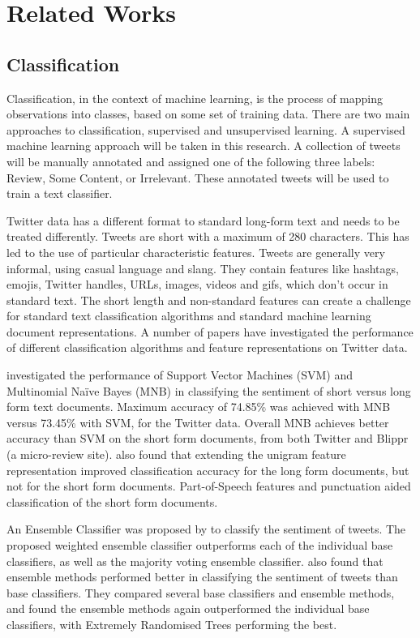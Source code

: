 \section{Related Works}

\subsection{Classification}

Classification, in the context of machine learning, is the process of mapping observations into classes, based on some set of training data. There are two main approaches to classification, supervised and unsupervised learning. A supervised machine learning approach will be taken in this research. A collection of tweets will be manually annotated and assigned one of the following three labels: Review, Some Content, or Irrelevant. These annotated tweets will be used to train a text classifier. 

Twitter data has a different format to standard long-form text and needs to be treated differently. Tweets are short with a maximum of 280 characters. This has led to the use of particular characteristic features. Tweets are generally very informal, using casual language and slang. They contain features like hashtags, emojis, Twitter handles, URLs, images, videos and gifs, which don't occur in standard text. The short length and non-standard features can create a challenge for standard text classification algorithms and standard machine learning document representations. A number of papers have investigated the performance of different classification algorithms and feature representations on Twitter data. 

\cite{Berm2010} investigated the performance of Support Vector Machines (SVM) and Multinomial Naïve Bayes (MNB) in classifying the sentiment of short versus long form text documents. Maximum accuracy of 74.85\% was achieved with MNB versus 73.45\% with SVM, for the Twitter data. Overall MNB achieves better accuracy than SVM on the short form documents, from both Twitter and Blippr (a micro-review site). \cite{Berm2010} also found that extending the unigram feature representation improved classification accuracy for the long form documents, but not for the short form documents. Part-of-Speech features and punctuation aided classification of the short form documents.

An Ensemble Classifier was proposed by \cite{Ankit2018} to classify the sentiment of tweets. The proposed weighted ensemble classifier outperforms each of the individual base classifiers, as well as the majority voting ensemble classifier. \cite{Kanakaraj2015} also found that ensemble methods performed better in classifying the sentiment of tweets than base classifiers. They compared several base classifiers and ensemble methods, and found the ensemble methods again outperformed the individual base classifiers, with Extremely Randomised Trees performing the best.

